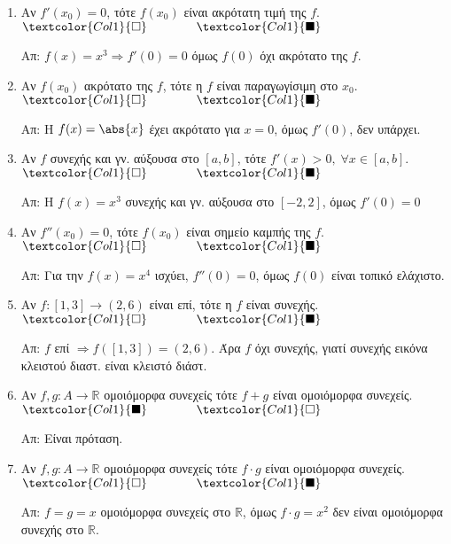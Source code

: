 \begin{enumerate}[itemsep=.5\baselineskip]
  \item \textcolor{Col1}{Αν $ f'(x_{0}) = 0 $, τότε $ f(x_{0}) $ είναι ακρότατη τιμή
    της $f$}.
    \hfill $\textcolor{Col1}{\square} \qquad \qquad \textcolor{Col1}{\blacksquare}$

    Απ: $ f(x)=x^{3} \Rightarrow f'(0)=0 $ όμως $ f(0) $ όχι ακρότατο της $f$. 

  \item \textcolor{Col1}{Αν $ f(x_{0}) $ ακρότατο της $f$, τότε η $f$ είναι
    παραγωγίσιμη στο $ x_{0} $}.
    \hfill $\textcolor{Col1}{\square} \qquad \qquad \textcolor{Col1}{\blacksquare}$

    Απ: Η $ f(x) = \abs{x} $ έχει ακρότατο για $ x=0 $, όμως $ f'(0) $, δεν υπάρχει.

  \item \textcolor{Col1}{Αν $f$ συνεχής και γν. αύξουσα στο $ [a,b] $, τότε $ f'(x)>0, \;
    \forall x \in [a,b] $}.
    \hfill $\textcolor{Col1}{\square} \qquad \qquad \textcolor{Col1}{\blacksquare}$

    Απ: Η $ f(x) = x^{3} $ συνεχής και γν. αύξουσα στο $ [-2,2] $, όμως $ f'(0)=0 $

  \item \textcolor{Col1}{Αν $ f''(x_{0}) = 0 $, τότε $ f(x_{0}) $ είναι σημείο καμπής 
    της $f$}.
    \hfill $\textcolor{Col1}{\square} \qquad \qquad \textcolor{Col1}{\blacksquare}$

    Απ: Για την $ f(x) = x^{4} $ ισχύει, $ f''(0)=0 $, όμως $ f(0) $ είναι τοπικό
    ελάχιστο.

  \item \textcolor{Col1}{Αν $ f \colon [1,3] \to (2,6) $ είναι επί, τότε η $f$ 
    είναι συνεχής}.
    \hfill $\textcolor{Col1}{\square} \qquad \qquad \textcolor{Col1}{\blacksquare}$

    Απ: $ f $ επί $ \Rightarrow f([1,3]) = (2,6) $. Άρα $f$ όχι συνεχής, 
    γιατί συνεχής εικόνα κλειστού διαστ. είναι κλειστό διάστ.

  \item \textcolor{Col1}{Αν $ f,g \colon A \to \mathbb{R} $ ομοιόμορφα συνεχείς τότε 
    $ f+g $ είναι ομοιόμορφα συνεχείς}.
    \hfill $\textcolor{Col1}{\blacksquare} \qquad \qquad \textcolor{Col1}{\square}$

    Απ: Είναι πρόταση.

  \item \textcolor{Col1}{Αν $ f,g \colon A \to \mathbb{R} $ ομοιόμορφα συνεχείς τότε 
    $ f\cdot g $ είναι ομοιόμορφα συνεχείς}.
    \hfill $\textcolor{Col1}{\square} \qquad \qquad \textcolor{Col1}{\blacksquare}$

    Απ: $ f=g=x $ ομοιόμορφα συνεχείς στο $\mathbb{R}$, όμως $ f\cdot g = x^{2} $ 
    δεν είναι ομοιόμορφα συνεχής στο $\mathbb{R}$.

\end{enumerate}


